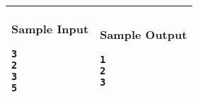 \begin{table}[!h]
\centering
\begin{tabular}{|l|l|}
\hline
\begin{minipage}[t]{3in}
\textbf{Sample Input}
\begin{verbatim}
3
2
3
5
\end{verbatim}
\vspace{1mm}
\end{minipage}
&

\begin{minipage}[t]{3in}
\textbf{Sample Output}
\begin{verbatim}
1
2
3
\end{verbatim}
\vspace{1mm}
\end{minipage} \\
\hline
\end{tabular}
\end{table}

\newpage

